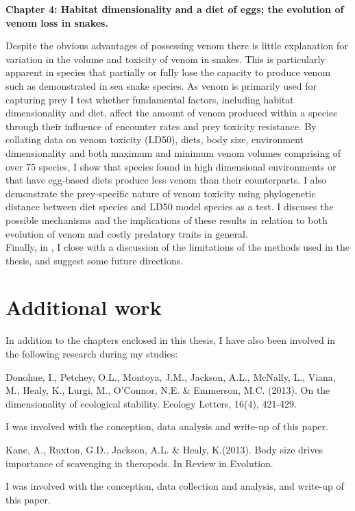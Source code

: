 \textbf{Chapter 4: Habitat dimensionality and a diet of eggs; the evolution of venom loss in snakes.}


Despite the obvious advantages of possessing venom there is little explanation for variation in the volume and toxicity of venom in snakes. This is particularly apparent in species that partially or fully lose the capacity to produce venom such as demonstrated in sea snake species. As venom is primarily used for capturing prey I test whether fundamental factors, including habitat dimensionality and diet, affect the amount of venom produced within a species through their influence of encounter rates and prey toxicity resistance. By collating data on venom toxicity (LD50), diets, body size, environment dimensionality and both maximum and minimum venom volumes comprising of over 75 species, I show that species found in high dimensional environments or that have egg-based diets produce less venom than their counterparts. I also demonstrate the prey-specific nature of venom toxicity using phylogenetic distance between diet species and LD50 model species as a test. I discuses the possible mechanisms and the implications of these results in relation to both evolution of venom and costly predatory traits in general.\\

%
%
Finally, in , I close with a discussion of the
limitations of the methods used in the thesis, and suggest some future
directions.

\section{\uppercase{A}dditional work}
In addition to the chapters enclosed in this thesis, I have also been involved in the following research during my studies:\\

\begin{singlespace}
Donohue, I., Petchey, O.L., Montoya, J.M., Jackson, A.L., McNally, L., Viana, M., Healy, K., Lurgi, M., O’Connor, N.E. \& Emmerson, M.C. (2013). On the dimensionality of ecological stability. Ecology Letters, 16(4), 421-429. \\
\end{singlespace}

\noindent
I was involved with the conception, data analysis and write-up of this paper. \\

\begin{singlespace}
Kane, A., Ruxton, G.D., Jackson, A.L. \& Healy, K.(2013). Body size drives importance of scavenging in theropods. In Review in Evolution. \\
\end{singlespace}

\noindent
I was involved with the conception, data collection and analysis, and write-up of this paper. \\



%
%

